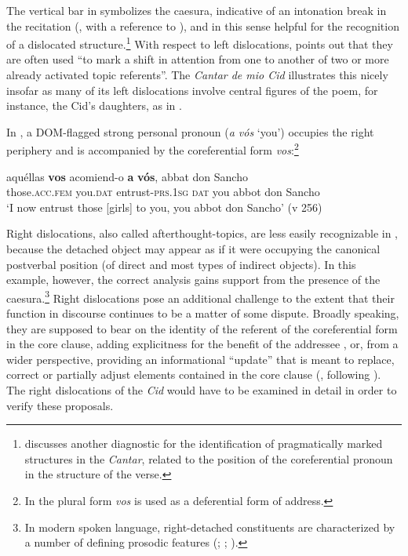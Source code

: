 \documentclass[output=paper]{LSP/langsci}
\begin{document}
The vertical bar in  symbolizes the caesura, indicative of an intonation break in the recitation (\citealt[71]{Gabrieletal2010Information}, with a reference to \citealt[263]{Fontana1993Phrase}), and in this sense helpful for the recognition of a dislocated structure.\footnote{\citet[400]{MenendezPidal1964Cantar} discusses another diagnostic for the identification of pragmatically marked structures in the \textit{Cantar}, related to the position of the coreferential pronoun in the structure of the verse.} With respect to left dislocations, \citet[183]{Lambrecht1994Information} points out that they are often used “to mark a shift in attention from one to another of two or more already activated topic referents”. The \textit{Cantar de mio Cid} illustrates this nicely insofar as many of its left dislocations involve central figures of the poem, for instance, the Cid’s daughters, as in .

 In , a DOM-flagged strong personal pronoun (\textit{a vós} ‘you’) occupies the right periphery and is accompanied by the coreferential form \textit{vos}:\footnote{In  the plural form \textit{vos} is used as a deferential form of address.}

\begin{exe}
\ex%
\label{04-me-ex:5}
\gll aquéllas \textbf{vos} acomiend-o {\textbar} \textbf{a} \textbf{vós}, abbat don Sancho\\
those.\textsc{acc.fem} you.\textsc{dat} entrust-\textsc{prs.1sg} {} \textsc{dat} you abbot don Sancho\\
\glt ‘I now entrust those [girls] to you, you abbot don Sancho’ (v 256)
\end{exe}

Right dislocations, also called afterthought-topics, are less easily recognizable in , because the detached object may appear as if it were occupying the canonical postverbal position (of direct and most types of indirect objects). In this example, however, the correct analysis gains support from the presence of the caesura.\footnote{In modern spoken language, right-detached constituents are characterized by a number of defining prosodic features (\citealt[765]{Anagnostopoulou1999Conditions}; \citealt[852]{Escandell-Vidal2009Differential}; \citealt[64–65]{Gabrieletal2010Information}).} Right dislocations pose an additional challenge to the extent that their function in discourse continues to be a matter of some dispute. Broadly speaking, they are supposed to bear on the identity of the referent of the coreferential form in the core clause, adding explicitness for the benefit of the addressee \citep[2003]{Lambrecht1994Information}, or, from a wider perspective, providing an informational “update” that is meant to replace, correct or partially adjust elements contained in the core clause (\citealt[856–859]{Escandell-Vidal2009Differential}, following \citealt{Vallduvi1992Informational}). The right dislocations of the \textit{Cid} would have to be examined in detail in order to verify these proposals. 
\end{document}
